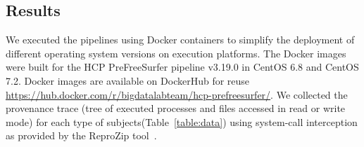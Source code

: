\documentclass[a4paper,num-refs]{oup-contemporary}
\newcommand{\reprozip}[0]{ReproZip\xspace}
\begin{document}
%



\subsection{Results}

We executed the pipelines using Docker containers to simplify the 
deployment of different operating system versions on execution 
platforms. The Docker images were built for the HCP PreFreeSurfer 
pipeline v3.19.0 in 
CentOS 6.8 and CentOS 7.2. Docker images are available on DockerHub for 
reuse \url{https://hub.docker.com/r/bigdatalabteam/hcp-prefreesurfer/}. 
We collected the provenance trace (tree of executed processes and files 
accessed in read or write mode) for each type of 
subjects(Table~\ref{table:data}) using system-call interception as 
provided by the \reprozip tool~\cite{Chirigati2016}.
\end{document}
